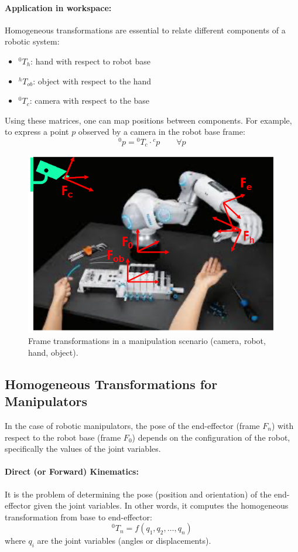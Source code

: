 \paragraph{Application in workspace:}
Homogeneous transformations are essential to relate different components of a robotic system:
\begin{itemize}
  \item ${}^0T_h$: hand with respect to robot base
  \item ${}^hT_{ob}$: object with respect to the hand
  \item ${}^0T_c$: camera with respect to the base
\end{itemize}

Using these matrices, one can map positions between components. For example, to express a point $p$ observed by a camera in the robot base frame:
\[
{}^0p = {}^0T_c \cdot {}^c p \qquad \forall p
\]

\begin{figure}[H]
  \centering
  \includegraphics[width=0.65\linewidth]{imgs/homogeneous_workspace_robot.png}
  \caption{Frame transformations in a manipulation scenario (camera, robot, hand, object).}
\end{figure}

\hfill

\subsection{Homogeneous Transformations for Manipulators}

In the case of robotic manipulators, the pose of the end-effector (frame $F_n$) with respect to the robot base (frame $F_0$) depends on the configuration of the robot, specifically the values of the joint variables.

\paragraph{Direct (or Forward) Kinematics:}
It is the problem of determining the pose (position and orientation) of the end-effector given the joint variables. In other words, it computes the homogeneous transformation from base to end-effector:
\[
{}^0T_n = f(q_1, q_2, \dots, q_n)
\]
where $q_i$ are the joint variables (angles or displacements).

